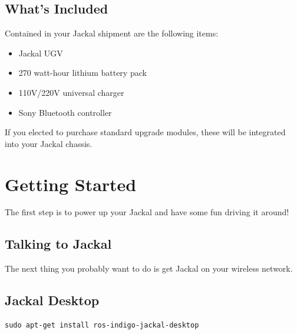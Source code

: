 \documentclass[]{article}
\begin{document}
\subsection{What's Included}

Contained in your Jackal shipment are the following items:

\begin{itemize}
  \item Jackal UGV
  \item 270 watt-hour lithium battery pack
  \item 110V/220V universal charger
  \item Sony Bluetooth controller
\end{itemize}

If you elected to purchase standard upgrade modules, these will be integrated into your Jackal chassis.

\section{Getting Started}

The first step is to power up your Jackal and have some fun driving it around!

\subsection{Talking to Jackal}

The next thing you probably want to do is get Jackal on your wireless network.

\subsection{Jackal Desktop}

\begin{lstlisting}
sudo apt-get install ros-indigo-jackal-desktop
\end{lstlisting}
\end{document}
